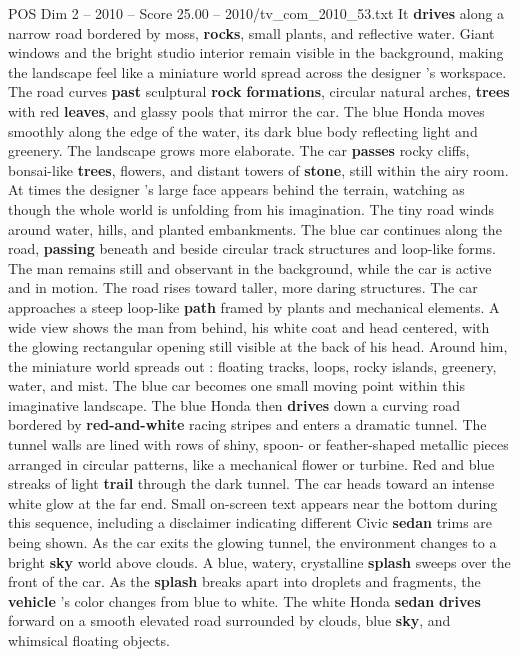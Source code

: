 \begin{textsample}{POS Dim 2 – 2010 – Score 25.00 – 2010/tv\_com\_2010\_53.txt}
It \textbf{drives} along a narrow road bordered by moss, \textbf{rocks}, small plants, and reflective water.
Giant windows and the bright studio interior remain visible in the background, making the landscape feel like a miniature world spread across the designer ’s workspace.
The road curves \textbf{past} sculptural \textbf{rock} \textbf{formations}, circular natural arches, \textbf{trees} with red \textbf{leaves}, and glassy pools that mirror the car.
The blue Honda moves smoothly along the edge of the water, its dark blue body reflecting light and greenery.
The landscape grows more elaborate.
The car \textbf{passes} rocky cliffs, bonsai-like \textbf{trees}, flowers, and distant towers of \textbf{stone}, still within the airy room.
At times the designer ’s large face appears behind the terrain, watching as though the whole world is unfolding from his imagination.
The tiny road winds around water, hills, and planted embankments.
The blue car continues along the road, \textbf{passing} beneath and beside circular track structures and loop-like forms.
The man remains still and observant in the background, while the car is active and in motion.
The road rises toward taller, more daring structures.
The car approaches a steep loop-like \textbf{path} framed by plants and mechanical elements.
A wide view shows the man from behind, his white coat and head centered, with the glowing rectangular opening still visible at the back of his head.
Around him, the miniature world spreads out : floating tracks, loops, rocky islands, greenery, water, and mist.
The blue car becomes one small moving point within this imaginative landscape.
The blue Honda then \textbf{drives} down a curving road bordered by \textbf{red-and-white} racing stripes and enters a dramatic tunnel.
The tunnel walls are lined with rows of shiny, spoon- or feather-shaped metallic pieces arranged in circular patterns, like a mechanical flower or turbine.
Red and blue streaks of light \textbf{trail} through the dark tunnel.
The car heads toward an intense white glow at the far end.
Small on-screen text appears near the bottom during this sequence, including a disclaimer indicating different Civic \textbf{sedan} trims are being shown.
As the car exits the glowing tunnel, the environment changes to a bright \textbf{sky} world above clouds.
A blue, watery, crystalline \textbf{splash} sweeps over the front of the car.
As the \textbf{splash} breaks apart into droplets and fragments, the \textbf{vehicle} ’s color changes from blue to white.
The white Honda \textbf{sedan} \textbf{drives} forward on a smooth elevated road surrounded by clouds, blue \textbf{sky}, and whimsical floating objects.

\end{textsample}

